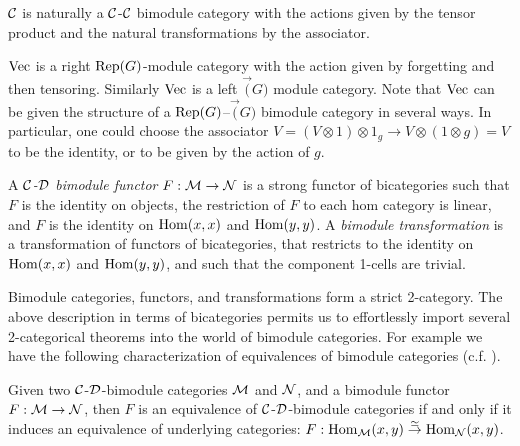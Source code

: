 \documentclass{amsart}
\begin{document}
\begin{example}
$\cC$ is naturally a $\cC$-$\cC$ bimodule category with the actions given by the tensor product and the natural transformations by the associator.
\end{example}

\begin{example}
$\Vec$ is a right $\Rep(G)$-module category with the action given by forgetting and then tensoring.  Similarly $\Vec$ is a left $\Vec(G)$ module category.  Note that $\Vec$ can be given the structure of a $\Rep(G)$--$\Vec(G)$ bimodule category in several ways.  In particular, one could choose the associator $V = (V \otimes 1) \otimes 1_g \rightarrow V \otimes (1 \otimes g) = V$ to be the identity, or to be given by the action of $g$.
\end{example}

\begin{definition}		
A {\em $\cC$-$\cD$ bimodule functor} $F:\cM \to \cN$ is a strong functor of bicategories such that 
		 $F$ is the identity on objects,
		  the restriction of $F$ to each hom category is linear,
		 and $F$ is the identity on $\Hom(x,x)$ and $\Hom(y,y)$.
	A {\em bimodule transformation} is a transformation of functors of bicategories, that restricts to the identity on $\Hom(x,x)$ and $\Hom(y,y)$, and such that the component 1-cells are trivial.  
\end{definition} %
	
%
\nid Bimodule categories, functors, and transformations form a strict 2-category.  %
 The above description in terms of bicategories permits us to effortlessly import several 2-categorical theorems into the world of bimodule categories. For example we have the following characterization of equivalences of bimodule categories (c.f. \cite{MR2664622}). 
 
\begin{lemma} \label{lem:Recog_equiv_of_bimod}
	Given two $\cC$-$\cD$-bimodule categories $\cM$ and $\cN$, and a bimodule functor $F:\cM \to \cN$, then $F$ is an equivalence of $\cC$-$\cD$-bimodule categories if and only if it induces an equivalence of underlying categories: $F: \Hom_{\cM}(x,y) \stackrel{\simeq}{\to} \Hom_{\cN}(x,y)$. 
\end{lemma}
\end{document}
